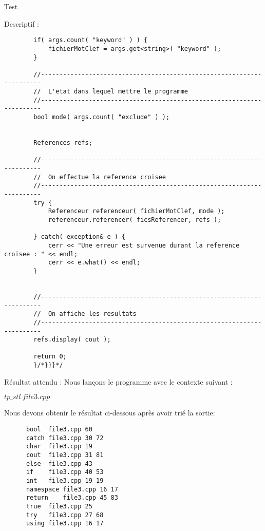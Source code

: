 \documentclass{article}
\begin{document}
\begin{subsection}{Test }
\begin{paragraph}{Descriptif :}
\begin{verbatim}
		if( args.count( "keyword" ) ) {
		    fichierMotClef = args.get<string>( "keyword" );
		}

		//----------------------------------------------------------------------
		//  L'etat dans lequel mettre le programme
		//----------------------------------------------------------------------
		bool mode( args.count( "exclude" ) );


		References refs;

		//----------------------------------------------------------------------
		//  On effectue la reference croisee
		//----------------------------------------------------------------------
		try {
		    Referenceur referenceur( fichierMotClef, mode );
		    referenceur.referencer( ficsReferencer, refs );

		} catch( exception& e ) {
		    cerr << "Une erreur est survenue durant la reference croisee : " << endl;
		    cerr << e.what() << endl;
		}


		//----------------------------------------------------------------------
		//  On affiche les resultats
		//----------------------------------------------------------------------
		refs.display( cout );

		return 0;
	    }/*}}}*/
      \end{verbatim}
      
    \end{paragraph}
    
    \newpage 
    
    \begin{paragraph}{Résultat attendu :}
       Nous lançons le programme avec le contexte suivant :  
       \begin{center}
	\textbf{$tp\_stl\ file3.cpp$}
      \end{center}
      
      Nous devons obtenir le résultat ci-dessous après avoir trié la sortie: 
      \begin{listing}[h!]
      \begin{verbatim}
	  bool	file3.cpp 60	
	  catch	file3.cpp 30 72	
	  char	file3.cpp 19	
	  cout	file3.cpp 31 81	
	  else	file3.cpp 43	
	  if	file3.cpp 40 53	
	  int	file3.cpp 19 19	
	  namespace	file3.cpp 16 17	
	  return	file3.cpp 45 83	
	  true	file3.cpp 25	
	  try	file3.cpp 27 68	
	  using	file3.cpp 16 17		
      \end{verbatim}
  
      \end{listing}
    \end{paragraph}
    
    
  \end{subsection}
\end{document}
